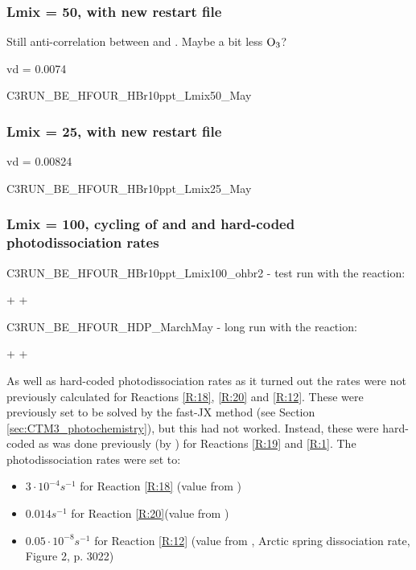 \subsubsection{Lmix = 50, with new restart file}

Still anti-correlation between  and . Maybe a bit less $\mathrm{O_3}$? 

vd = 0.0074 

C3RUN\_BE\_HFOUR\_HBr10ppt\_Lmix50\_May

\subsubsection{Lmix = 25, with new restart file}

vd = 0.00824

C3RUN\_BE\_HFOUR\_HBr10ppt\_Lmix25\_May


\subsubsection{Lmix = 100, cycling of  and  and hard-coded photodissociation rates}

C3RUN\_BE\_HFOUR\_HBr10ppt\_Lmix100\_ohbr2 - test run with the reaction: 

\begin{reaction}
     +  \rightarrow {} + 
    \label{rqn:oh_br2}
\end{reaction}

C3RUN\_BE\_HFOUR\_HDP\_MarchMay - long run with the reaction: 

\begin{reaction}
     +  \rightarrow {} + 
    \label{rqn:oh_hbr}
\end{reaction}

As well as hard-coded photodissociation rates as it turned out the rates were not previously calculated for Reactions \ref{R:18}, \ref{R:20} and \ref{R:12}. These were previously set to be solved by the fast-JX method (see Section \ref{sec:CTM3_photochemistry}), but this had not worked. Instead, these were hard-coded as was done previously (by \cite{Susanne}) for Reactions \ref{R:19} and \ref{R:1}. The photodissociation rates were set to: 

\begin{itemize}
    \item $3\cdot10^{-4} s^{-1}$ for Reaction \ref{R:18} (value from \cite{CAO})
    \item $0.014 s^{-1}$ for Reaction \ref{R:20}(value from \cite{CAO})
    \item $0.05\cdot10^{-8} s^{-1}$ for Reaction \ref{R:12} (value from \cite{Papanastasiou2013}, Arctic spring dissociation rate, Figure 2, p. 3022)
\end{itemize}


